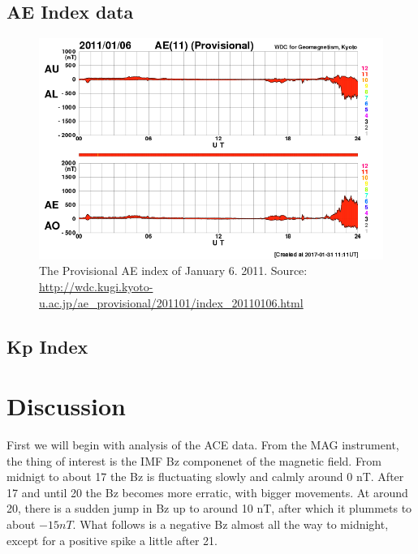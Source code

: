 \documentclass[norsk,a4paper,11pt]{article}
\begin{document}
\begin{multicols}{2}

\subsection{AE Index data} %
\label{sub:AE_index_data}

\begin{figure}[H]
	\includegraphics[scale=0.4]{Figures/pvae_2011_01_06.png}
	\centering
	\caption{The Provisional AE index of January 6. 2011. Source: \url{http://wdc.kugi.kyoto-u.ac.jp/ae_provisional/201101/index_20110106.html}}
	\label{fig:AE}
\end{figure}


\subsection{Kp Index} %
\label{sub:kp_index}

 


\section{Discussion} %
\label{sec:discussion}
First we will begin with analysis of the ACE data. From the MAG instrument, the thing of interest is the IMF Bz componenet of the magnetic field. From midnigt to about 17 the Bz is fluctuating slowly and calmly around 0 nT. After 17 and until 20 the Bz becomes more erratic, with bigger movements. At around 20, there is a sudden jump in Bz up to around 10 nT, after which it plummets to about $- 15 nT$. What follows is a negative Bz almost all the way to midnight, except for a positive spike a little after 21.



\end{multicols}
\end{document}
